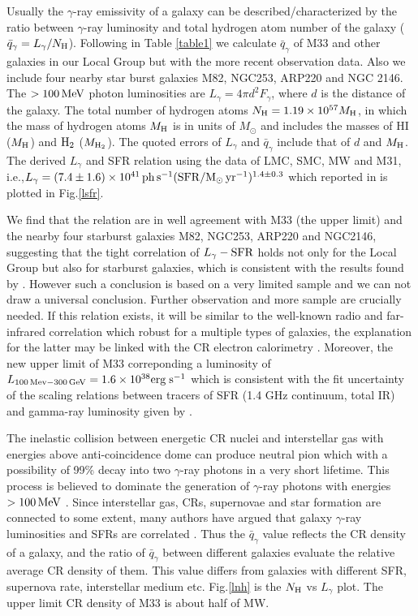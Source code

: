 \documentclass[useAMS,usenatbib,referee]{mn2e}
\begin{document}
Usually the $\gamma$-ray emissivity of a galaxy can be described/characterized by the ratio between $\gamma$-ray luminosity and total hydrogen atom number of the galaxy (${\bar q}_{\gamma}=L_{\gamma}/N_{\rm H}$). Following \citet{aaa+2010c} in Table \ref{table1} we calculate ${\bar q}_{\gamma}$ of M33 and other galaxies in our Local Group but with the more recent observation data. Also we include four nearby star burst galaxies M82, NGC253, ARP220 and NGC 2146. The $>100\,\rm MeV$ photon luminosities are $L_{\gamma}=4\pi d^2 F_{\gamma}$, where $d$ is the distance of the galaxy. The total number of hydrogen atoms $N_{\rm H}=1.19\times 10^{57}M_{\rm H}$, in which the mass of hydrogen atoms $M_{\rm H}$ is in units of $M_\odot$ and includes the masses of HI ($M_{\rm H}$) and $\rm H_{2}$ ($M_{\rm H_2}$). The quoted errors of $L_{\gamma}$ and ${\bar q}_{\gamma}$ include that of $d$ and $M_{\rm H}$. The derived $L_{\gamma}$ and SFR relation using the data of LMC, SMC, MW and M31, i.e.,$L_{\gamma}=(7.4\pm1.6)\times 10^{41} \rm \, ph\,s^{-1} ({\rm SFR}/M_{\odot}\,\rm yr^{-1})^{1.4\pm0.3}$ which reported in \citet{aaa+2010c} is plotted in Fig.\ref{lsfr}.

We find that the relation are in well agreement with M33 (the upper limit) and the nearby four starburst galaxies M82, NGC253, ARP220 and NGC2146, suggesting that the tight correlation of $L_{\gamma}-{\rm SFR}$ holds not only for the Local Group but also for starburst galaxies, which is consistent with the results found by \citet{aaa+2010c}. However such a conclusion is based on a very limited sample and we can not draw a universal conclusion. Further observation and more sample are crucially needed. If this relation exists, it will be similar to the well-known radio and far-infrared correlation which robust for a multiple types of galaxies, the explanation for the latter may be linked with the CR electron calorimetry \citep{aaa+2010c}. Moreover, the new upper limit of M33 correponding a luminosity of $L_{\rm 100\,Mev-300\,GeV}=1.6 \times 10^{38} \rm erg\;s^{-1}$ which is consistent with the fit uncertainty of the scaling relations between tracers of SFR (1.4 GHz continuum, total IR) and gamma-ray luminosity given by \citet{aaa+2012}.

The inelastic collision between energetic CR nuclei and interstellar gas with energies above anti-coincidence dome can produce neutral pion which with a possibility of 99\% decay into two $\gamma$-ray photons in a very short lifetime. This process is believed to dominate the generation of $\gamma$-ray photons with energies $>100\,\rm MeV$ \citep[see e.g.][]{sbd+1998,pf2001}. Since interstellar gas, CRs, supernovae and star formation are connected to some extent, many authors have argued that galaxy $\gamma$-ray luminosities and SFRs are correlated \citep[e.g.][]{pf2002,tks+2004,tqw2007,stecker2007,pr2010,ltq+2011}. Thus the ${\bar q}_\gamma$ value reflects the CR density of a galaxy, and the ratio of ${\bar q}_\gamma$ between different galaxies evaluate the relative average CR density of them. This value differs from galaxies with different SFR, supernova rate, interstellar medium etc. Fig.\ref{lnh} is the $N_{\rm H}$ vs $L_{\gamma}$ plot. The upper limit CR density of M33 is about half of MW.
\end{document}
